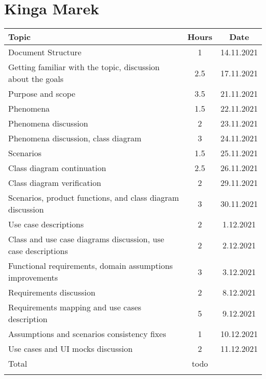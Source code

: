 \section*{Kinga Marek}
\begin{table}[H]
    \centering
    \begin{tabular}{lcc} \Xhline{1.5pt}
        Topic &  Hours & Date \\ \hline
        Document Structure & 1 & 14.11.2021 \\ 
        Getting familiar with the topic, discussion about the goals & 2.5 & 17.11.2021 \\ 
        Purpose and scope & 3.5 & 21.11.2021 \\
        Phenomena & 1.5 & 22.11.2021 \\ 
        Phenomena discussion & 2 & 23.11.2021 \\
        Phenomena discussion, class diagram & 3 & 24.11.2021 \\ 
        Scenarios & 1.5 & 25.11.2021 \\ 
        Class diagram continuation & 2.5 & 26.11.2021 \\
        Class diagram verification & 2 & 29.11.2021 \\
        Scenarios, product functions, and class diagram discussion & 3 & 30.11.2021\\ 
        Use case descriptions & 2 & 1.12.2021\\
        Class and use case diagrams discussion, use case descriptions & 2 & 2.12.2021\\
        Functional requirements, domain assumptions improvements & 3 & 3.12.2021\\
        Requirements discussion & 2 & 8.12.2021\\
        Requirements mapping and use cases description & 5 & 9.12.2021\\
        Assumptions and scenarios consistency fixes & 1 & 10.12.2021\\
        Use cases and UI mocks discussion & 2 & 11.12.2021\\
        \hline
        Total & todo & \\ \Xhline{1.5pt}
    \end{tabular}
\end{table}